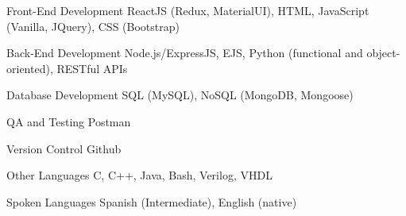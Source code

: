 \newcommand{\Csh}{C{\lserif\#}}



\begin{cvskills}




\cvskill
{Front-End Development} %
{ReactJS (Redux, MaterialUI), HTML, JavaScript (Vanilla, JQuery), CSS (Bootstrap)} %


\cvskill
{Back-End Development} %
{Node.js/ExpressJS, EJS, Python (functional and object-oriented), RESTful APIs} %

\cvskill
{Database Development} %
{SQL (MySQL), NoSQL (MongoDB, Mongoose)} %


\cvskill
{QA and Testing} %
{Postman} %


\cvskill
{Version Control} %
{Github} %


\cvskill
{Other Languages} %
{C, C++, Java, Bash, Verilog, VHDL} %


\cvskill
{Spoken Languages} %
{Spanish (Intermediate), English (native)} %


\end{cvskills}